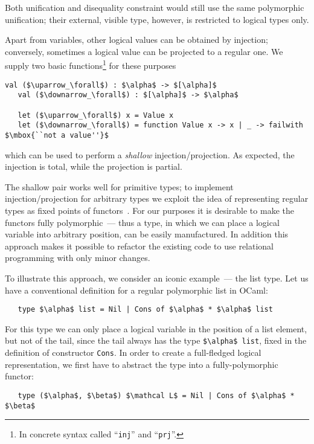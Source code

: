 Both unification and disequality constraint would still use the same polymorphic unification; their external, visible type,
however, is restricted to logical types only.

Apart from variables, other logical values can be obtained by injection; conversely, sometimes a logical value can be projected to
a regular one. We supply two basic functions\footnote{In concrete syntax called ``\lstinline|inj|'' and ``\lstinline|prj|''.}
for these purposes

\begin{lstlisting}[mathescape=true]
   val ($\uparrow_\forall$) : $\alpha$ -> $[\alpha]$
   val ($\downarrow_\forall$) : $[\alpha]$ -> $\alpha$

   let ($\uparrow_\forall$) x = Value x
   let ($\downarrow_\forall$) = function Value x -> x | _ -> failwith $\mbox{``not a value''}$
\end{lstlisting}

\noindent which can be used to perform a \emph{shallow} injection/projection. As expected, the injection is total, while the projection is partial.

The shallow pair works well for primitive types; to implement injection/projection for arbitrary types we exploit the
idea of representing regular types as fixed points of functors~\cite{ALaCarte}. For our purposes it is desirable to make
the functors fully polymorphic~--- thus a type, in which we can place a logical variable into arbitrary position,
can be easily manufactured. In addition this approach makes it possible to refactor the existing code to use relational
programming with only minor changes.

To illustrate this approach, we consider an iconic example~--- the list type. Let us have a conventional definition
for a regular polymorphic list in OCaml:

\begin{lstlisting}
   type $\alpha$ list = Nil | Cons of $\alpha$ * $\alpha$ list
\end{lstlisting}

For this type we can only place a logical variable in the position of a list element, but not of the tail, since the tail
always has the type \lstinline|$\alpha$ list|, fixed in the definition of constructor \lstinline|Cons|. In order to create
a full-fledged logical representation, we first have to abstract the type into a fully-polymorphic functor:

\begin{lstlisting}
   type ($\alpha$, $\beta$) $\mathcal L$ = Nil | Cons of $\alpha$ * $\beta$
\end{lstlisting}

